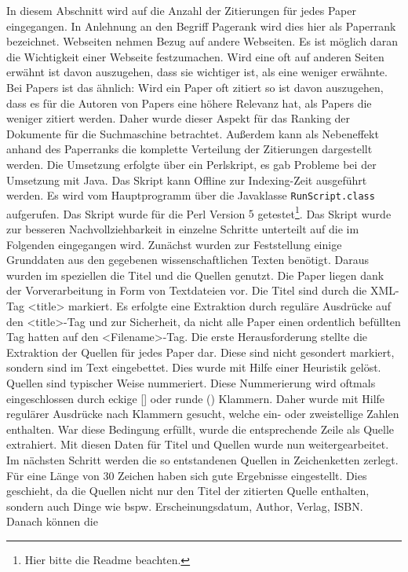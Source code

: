 In diesem Abschnitt wird auf die Anzahl der Zitierungen für jedes
Paper eingegangen. In Anlehnung an den Begriff Pagerank wird dies hier
als Paperrank bezeichnet.  Webseiten nehmen Bezug auf andere
Webseiten. Es ist möglich daran die Wichtigkeit einer Webseite
festzumachen. Wird eine oft auf anderen Seiten erwähnt ist davon
auszugehen, dass sie wichtiger ist, als eine weniger erwähnte. Bei
Papers ist das ähnlich: Wird ein Paper oft zitiert so ist davon
auszugehen, dass es für die Autoren von Papers eine höhere Relevanz
hat, als Papers die weniger zitiert werden. Daher wurde dieser Aspekt
für das Ranking der Dokumente für die Suchmaschine
betrachtet. Außerdem kann als Nebeneffekt anhand des Paperranks die
komplette Verteilung der Zitierungen dargestellt werden.  Die
Umsetzung erfolgte über ein Perlskript, es gab Probleme bei der
Umsetzung mit Java. Das Skript kann Offline zur Indexing-Zeit
ausgeführt werden. Es wird vom Hauptprogramm über die Javaklasse
\lstinline{RunScript.class} aufgerufen. Das Skript wurde für die Perl
Version $5$ getestet\footnote{Hier bitte die Readme beachten.}. Das
Skript wurde zur besseren Nachvollziehbarkeit in einzelne Schritte
unterteilt auf die im Folgenden eingegangen wird.  Zunächst wurden zur
Feststellung einige Grunddaten aus den gegebenen wissenschaftlichen
Texten benötigt. Daraus wurden im speziellen die Titel und die Quellen
genutzt. Die Paper liegen dank der Vorverarbeitung in Form von
Textdateien vor. Die Titel sind durch die XML-Tag <title> markiert. Es
erfolgte eine Extraktion durch reguläre Ausdrücke auf den <title>-Tag
und zur Sicherheit, da nicht alle Paper einen ordentlich befüllten Tag
hatten auf den <Filename>-Tag.  Die erste Herausforderung stellte die
Extraktion der Quellen für jedes Paper dar. Diese sind nicht gesondert
markiert, sondern sind im Text eingebettet. Dies wurde mit Hilfe einer
Heuristik gelöst. Quellen sind typischer Weise nummeriert. Diese
Nummerierung wird oftmals eingeschlossen durch eckige [] oder runde ()
Klammern. Daher wurde mit Hilfe regulärer Ausdrücke nach Klammern
gesucht, welche ein- oder zweistellige Zahlen enthalten. War diese
Bedingung erfüllt, wurde die entsprechende Zeile als Quelle
extrahiert. Mit diesen Daten für Titel und Quellen wurde nun
weitergearbeitet.  Im nächsten Schritt werden die so entstandenen
Quellen in Zeichenketten zerlegt. Für eine Länge von 30 Zeichen haben
sich gute Ergebnisse eingestellt. Dies geschieht, da die Quellen nicht
nur den Titel der zitierten Quelle enthalten, sondern auch Dinge wie
bspw. Erscheinungsdatum, Author, Verlag, ISBN.  Danach können die

